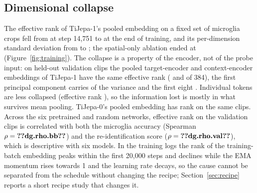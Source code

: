 \subsection{Dimensional collapse}
\label{sec:collapse}
The effective rank of TiJepa-1's pooled embedding on a fixed set of microglia crops fell
from  at step 14{,}751 to  at the end of
training, and its per-dimension standard deviation from  to
; the spatial-only ablation ended at 
(Figure~\ref{fig:training}). The collapse is a property of the encoder, not of the probe
input: on held-out validation clips the pooled target-encoder and context-encoder embeddings
of TiJepa-1 have the same effective rank ( and
 of 384), the first principal component carries
 of the variance and the first eight
. Individual tokens are less collapsed (effective rank
), so the information lost is mostly in what survives mean
pooling. TiJepa-0's pooled embedding has rank  on the same
clips. Across the six pretrained and random networks, effective rank on the validation
clips is correlated with both the microglia accuracy (Spearman $\rho=\val{dg.rho.bb}$) and
the re-identification score ($\rho=\val{dg.rho.val}$), which is descriptive with six
models. In the training logs the rank of the training-batch embedding peaks within the first
20{,}000 steps and declines while the EMA momentum rises towards 1 and the learning rate
decays, so the cause cannot be separated from the schedule without changing the recipe;
Section~\ref{sec:recipe} reports a short recipe study that changes it.

